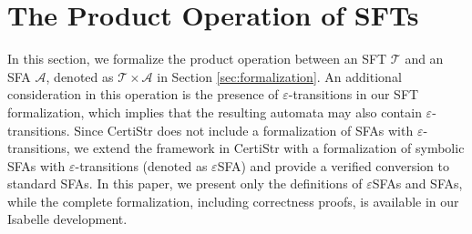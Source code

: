 \documentclass[sigplan,10pt,anonymous,review]{acmart}\settopmatter{printfolios=true,printccs=false,printacmref=false}
\begin{document}


\section{The Product Operation of SFTs}
\label{sec:product-operation}

In this section, we formalize the product operation between an SFT $\mathcal{T}$ and an SFA $\mathcal{A}$, denoted as $\mathcal{T} \times \mathcal{A}$ in Section \ref{sec:formalization}. An additional consideration in this operation is the presence of $\varepsilon$-transitions in our SFT formalization, which implies that the resulting automata may also contain $\varepsilon$-transitions. Since CertiStr \cite{cpp/KanLRS22} does not include a formalization of SFAs with $\varepsilon$-transitions, we extend the framework in CertiStr with a formalization of symbolic SFAs with $\varepsilon$-transitions (denoted as $\varepsilon$SFA) and provide a verified conversion to standard SFAs. In this paper, we present only the definitions of  $\varepsilon$SFAs and SFAs, while the complete formalization, including correctness proofs, is available in our Isabelle development.
\end{document}
